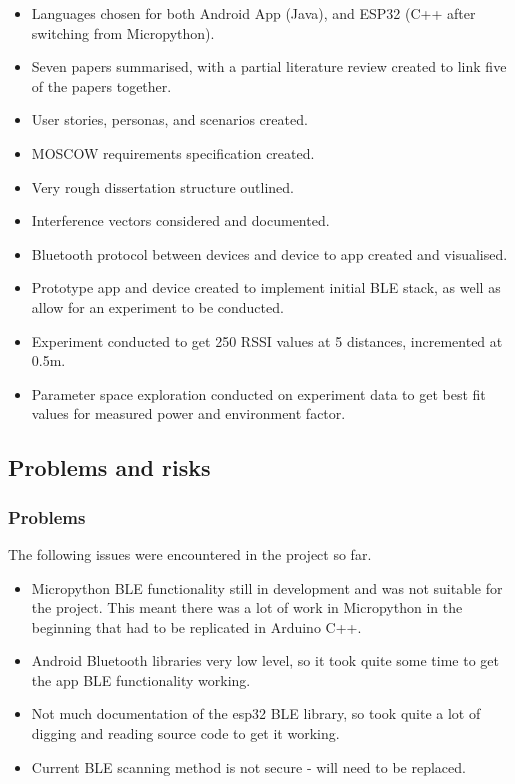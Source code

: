\documentclass[11pt]{article}
\begin{document}
\begin{itemize}
    \setlength\itemsep{0.1em}
\item Languages chosen for both Android App (Java), and ESP32 (C++ after switching
from Micropython).
\item Seven papers summarised, with a partial literature review created to link 
five of the papers together.
\item User stories, personas, and scenarios created.
\item  MOSCOW requirements specification created.
\item  Very rough dissertation structure outlined.
\item  Interference vectors considered and documented.
\item  Bluetooth protocol between devices and device to app created and visualised.
\item  Prototype app and device created to implement initial BLE stack, as well
as allow for an experiment to be conducted.
\item  Experiment conducted to get 250 RSSI values at 5 distances, incremented at 
0.5m.
\item  Parameter space exploration conducted on experiment data to get best fit 
values for measured power and environment factor.

\end{itemize}

\subsection{Problems and risks}\label{problems-and-risks}

\subsubsection{Problems}\label{problems}

The following issues were encountered in the project so far.

\begin{itemize}
    \setlength\itemsep{0.1em}
\item Micropython BLE functionality still in development and was not suitable for 
the project. This meant there was a lot of work in Micropython in the beginning that 
had to be replicated in Arduino C++.
\item Android Bluetooth libraries very low level, so it took quite some time to get 
the app BLE functionality working.
\item Not much documentation of the esp32 BLE library, so took quite a lot of digging
and reading source code to get it working.
\item Current BLE scanning method is not secure - will need to be replaced.

\end{itemize}
\end{document}
